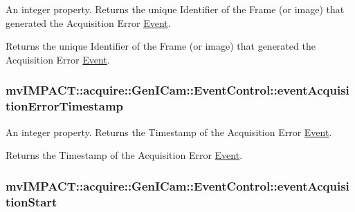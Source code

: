 An integer property. Returns the unique Identifier of the Frame (or image) that generated the Acquisition Error \hyperlink{classmv_i_m_p_a_c_t_1_1acquire_1_1_event}{Event}. 

Returns the unique Identifier of the Frame (or image) that generated the Acquisition Error \hyperlink{classmv_i_m_p_a_c_t_1_1acquire_1_1_event}{Event}. \hypertarget{classmv_i_m_p_a_c_t_1_1acquire_1_1_gen_i_cam_1_1_event_control_a5a344028e412bb078fa54c2d7d23ead6}{
\subsubsection[{event\+Acquisition\+Error\+Timestamp}]{ mv\+I\+M\+P\+A\+C\+T\+::acquire\+::\+Gen\+I\+Cam\+::\+Event\+Control\+::event\+Acquisition\+Error\+Timestamp}}\label{classmv_i_m_p_a_c_t_1_1acquire_1_1_gen_i_cam_1_1_event_control_a5a344028e412bb078fa54c2d7d23ead6}


An integer property. Returns the Timestamp of the Acquisition Error \hyperlink{classmv_i_m_p_a_c_t_1_1acquire_1_1_event}{Event}. 

Returns the Timestamp of the Acquisition Error \hyperlink{classmv_i_m_p_a_c_t_1_1acquire_1_1_event}{Event}. \hypertarget{classmv_i_m_p_a_c_t_1_1acquire_1_1_gen_i_cam_1_1_event_control_ad67f2921877e5a5c8256f7bf451e71ee}{
\subsubsection[{event\+Acquisition\+Start}]{ mv\+I\+M\+P\+A\+C\+T\+::acquire\+::\+Gen\+I\+Cam\+::\+Event\+Control\+::event\+Acquisition\+Start}}\label{classmv_i_m_p_a_c_t_1_1acquire_1_1_gen_i_cam_1_1_event_control_ad67f2921877e5a5c8256f7bf451e71ee}


